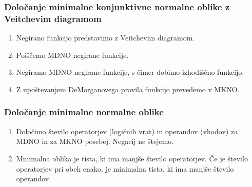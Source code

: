 \subsubsection{Določanje minimalne konjunktivne normalne oblike z Veitchevim diagramom}
\begin{enumerate}
\item Negirano funkcijo predstavimo z Veitchevim diagramom.
\item Poiščemo MDNO negirane funkcije.
\item Negiramo MDNO negirane funkcije, s čimer dobimo izhodiščno funkcijo.
\item Z upoštevanjem DeMorganovega pravila funkcijo prevedemo v MKNO.
\end{enumerate}

\subsubsection{Določanje minimalne normalne oblike}
\begin{enumerate}
\item Določimo število operatorjev (logičnih vrat) in operandov (vhodov) za MDNO in za MKNO posebej. Negacij ne štejemo.
\item Minimalna oblika je tista, ki ima manjše število operatorjev. Če je število operatorjev pri obeh enako, je minimalna tista, ki ima manjše število operandov.
\end{enumerate}

